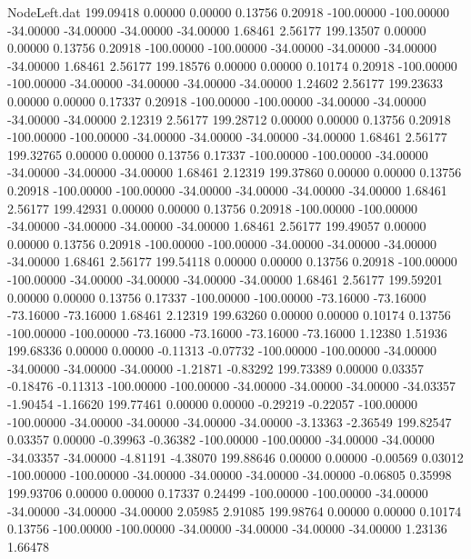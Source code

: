 \begin{filecontents}{NodeLeft.dat}
 199.09418    0.00000    0.00000     0.13756    0.20918 -100.00000 -100.00000  -34.00000  -34.00000  -34.00000  -34.00000    1.68461    2.56177
 199.13507    0.00000    0.00000     0.13756    0.20918 -100.00000 -100.00000  -34.00000  -34.00000  -34.00000  -34.00000    1.68461    2.56177
 199.18576    0.00000    0.00000     0.10174    0.20918 -100.00000 -100.00000  -34.00000  -34.00000  -34.00000  -34.00000    1.24602    2.56177
 199.23633    0.00000    0.00000     0.17337    0.20918 -100.00000 -100.00000  -34.00000  -34.00000  -34.00000  -34.00000    2.12319    2.56177
 199.28712    0.00000    0.00000     0.13756    0.20918 -100.00000 -100.00000  -34.00000  -34.00000  -34.00000  -34.00000    1.68461    2.56177
 199.32765    0.00000    0.00000     0.13756    0.17337 -100.00000 -100.00000  -34.00000  -34.00000  -34.00000  -34.00000    1.68461    2.12319
 199.37860    0.00000    0.00000     0.13756    0.20918 -100.00000 -100.00000  -34.00000  -34.00000  -34.00000  -34.00000    1.68461    2.56177
 199.42931    0.00000    0.00000     0.13756    0.20918 -100.00000 -100.00000  -34.00000  -34.00000  -34.00000  -34.00000    1.68461    2.56177
 199.49057    0.00000    0.00000     0.13756    0.20918 -100.00000 -100.00000  -34.00000  -34.00000  -34.00000  -34.00000    1.68461    2.56177
 199.54118    0.00000    0.00000     0.13756    0.20918 -100.00000 -100.00000  -34.00000  -34.00000  -34.00000  -34.00000    1.68461    2.56177
 199.59201    0.00000    0.00000     0.13756    0.17337 -100.00000 -100.00000  -73.16000  -73.16000  -73.16000  -73.16000    1.68461    2.12319
 199.63260    0.00000    0.00000     0.10174    0.13756 -100.00000 -100.00000  -73.16000  -73.16000  -73.16000  -73.16000    1.12380    1.51936
 199.68336    0.00000    0.00000    -0.11313   -0.07732 -100.00000 -100.00000  -34.00000  -34.00000  -34.00000  -34.00000   -1.21871   -0.83292
 199.73389    0.00000    0.03357    -0.18476   -0.11313 -100.00000 -100.00000  -34.00000  -34.00000  -34.00000  -34.03357   -1.90454   -1.16620
 199.77461    0.00000    0.00000    -0.29219   -0.22057 -100.00000 -100.00000  -34.00000  -34.00000  -34.00000  -34.00000   -3.13363   -2.36549
 199.82547    0.03357    0.00000    -0.39963   -0.36382 -100.00000 -100.00000  -34.00000  -34.00000  -34.03357  -34.00000   -4.81191   -4.38070
 199.88646    0.00000    0.00000    -0.00569    0.03012 -100.00000 -100.00000  -34.00000  -34.00000  -34.00000  -34.00000   -0.06805    0.35998
 199.93706    0.00000    0.00000     0.17337    0.24499 -100.00000 -100.00000  -34.00000  -34.00000  -34.00000  -34.00000    2.05985    2.91085
 199.98764    0.00000    0.00000     0.10174    0.13756 -100.00000 -100.00000  -34.00000  -34.00000  -34.00000  -34.00000    1.23136    1.66478

\end{filecontents}
